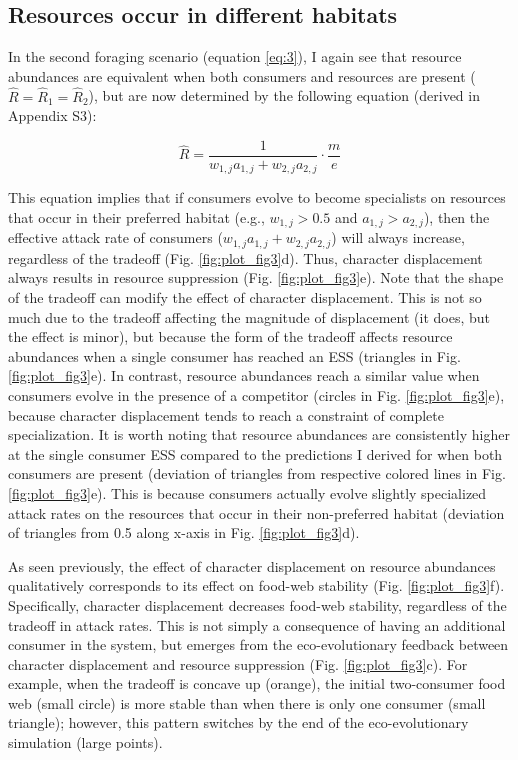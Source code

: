 \documentclass[11pt,]{article}
\begin{document}
\subsection{Resources occur in different
habitats}\label{resources-occur-in-different-habitats}

In the second foraging scenario (equation \ref{eq:3}), I again see that
resource abundances are equivalent when both consumers and resources are
present (\(\hat R = \hat R_1 = \hat R_2\)), but are now determined by
the following equation (derived in Appendix S3):

\begin{equation} \label{eq:6}
  \hat{R}=\frac{1}{w_{1,j}a_{1,j}+w_{2,j}a_{2,j}}\cdot\frac{m}{e}
\end{equation}

This equation implies that if consumers evolve to become specialists on
resources that occur in their preferred habitat (e.g., \(w_{1,j}>0.5\)
and \(a_{1,j}>a_{2,j}\)), then the effective attack rate of consumers
(\(w_{1,j}a_{1,j}+w_{2,j}a_{2,j}\)) will always increase, regardless of
the tradeoff (Fig. \ref{fig:plot_fig3}d). Thus, character displacement
always results in resource suppression (Fig. \ref{fig:plot_fig3}e). Note
that the shape of the tradeoff can modify the effect of character
displacement. This is not so much due to the tradeoff affecting the
magnitude of displacement (it does, but the effect is minor), but
because the form of the tradeoff affects resource abundances when a
single consumer has reached an ESS (triangles in Fig.
\ref{fig:plot_fig3}e). In contrast, resource abundances reach a similar
value when consumers evolve in the presence of a competitor (circles in
Fig. \ref{fig:plot_fig3}e), because character displacement tends to
reach a constraint of complete specialization. It is worth noting that
resource abundances are consistently higher at the single consumer ESS
compared to the predictions I derived for when both consumers are
present (deviation of triangles from respective colored lines in Fig.
\ref{fig:plot_fig3}e). This is because consumers actually evolve
slightly specialized attack rates on the resources that occur in their
non-preferred habitat (deviation of triangles from 0.5 along x-axis in
Fig. \ref{fig:plot_fig3}d).

As seen previously, the effect of character displacement on resource
abundances qualitatively corresponds to its effect on food-web stability
(Fig. \ref{fig:plot_fig3}f). Specifically, character displacement
decreases food-web stability, regardless of the tradeoff in attack
rates. This is not simply a consequence of having an additional consumer
in the system, but emerges from the eco-evolutionary feedback between
character displacement and resource suppression (Fig.
\ref{fig:plot_fig3}c). For example, when the tradeoff is concave up
(orange), the initial two-consumer food web (small circle) is more
stable than when there is only one consumer (small triangle); however,
this pattern switches by the end of the eco-evolutionary simulation
(large points).
\end{document}
